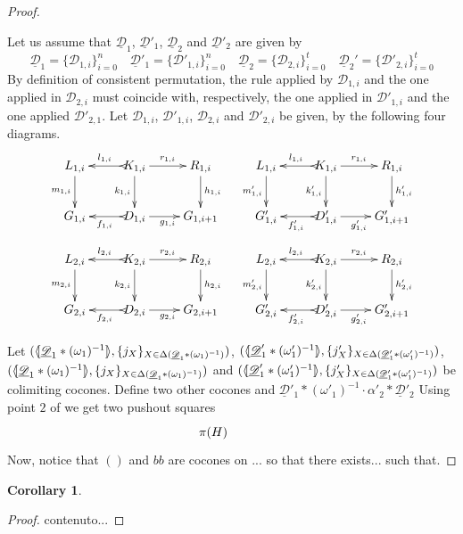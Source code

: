 \documentclass[a4paper]{article}
\newcommand{\dder}[1]{\mathscr{#1}}
\newcommand{\der}[1]{\underline{\dder{#1}}}
\newcommand{\lpro}{\langle \hspace{-1.85pt}[}
\newcommand{\rpro}{]\hspace{-1.85pt}\rangle}
\newtheorem{corollary}[theorem]{Corollary}
\theoremstyle{definition}
\begin{document}
\begin{proof}
\begin{itemize}
		
		Let us assume that $\der{D}_1$, $\der{D}'_1$, $\der{D}_2$ and $\der{D}'_2$ are given by
		\[\der{D}_1=\{\dder{D}_{1,i}\}_{i=0}^n \quad \der{D}'_1=\{\dder{D}'_{1,i}\}_{i=0}^n \quad \der{D}_2=\{\dder{D}_{2,i}\}_{i=0}^t \quad \der{D}_2'=\{\dder{D}'_{2,i}\}_{i=0}^t\]
		By definition of consistent permutation, the rule applied by $\dder{D}_{1,i}$ and the one applied in $\dder{D}_{2,i}$  must coincide with, respectively, the one applied in $\dder{D}'_{1,i}$ and the one applied $\dder{D}'_{2,1}$. Let $\dder{D}_{1,i}$, $\dder{D}'_{1,i}$, $\dder{D}_{2,i}$ and $\dder{D}'_{2,i}$ be given, by the following four diagrams. 
		\[\xymatrix{L_{1,i} \ar[d]_{m_{1, i}}& K_{1,i} \ar[d]_{k_{1, i}} \ar[r]^{r_{1,i}} \ar@{>->}[l]_{l_{1,i}} & R_{1,i}\ar[d]^{h_{1, i}} &L_{1,i} \ar[d]_{m'_{1, i}}& K_{1,i} \ar[d]_{k'_{1, i}} \ar[r]^{r_{1,i}} \ar@{>->}[l]_{l_{1,i}} & R_{1,i}\ar[d]^{h'_{1, i}} \\G_{1,i} & D_{1,i} \ar[r]_{g_{1,i}} \ar@{>->}[l]^{f_{1,i}} & G_{1,i+1} & G'_{1,i} & D'_{1,i}\ar[r]_{g'_{1,i}} \ar@{>->}[l]^{f'_{1,i}}  & G'_{1,i+1}}\]		
		\[\xymatrix{L_{2,i} \ar[d]_{m_{2, i}}& K_{2,i} \ar[d]_{k_{2, i}} \ar[r]^{r_{2,i}} \ar@{>->}[l]_{l_{2,i}} & R_{2,i}\ar[d]^{h_{2, i}} &L_{2,i} \ar[d]_{m'_{2, i}}& K_{2,i} \ar[d]_{k'_{2, i}} \ar[r]^{r_{2,i}} \ar@{>->}[l]_{l_{2,i}} & R_{2,i}\ar[d]^{h'_{2, i}} \\G_{2,i} & D_{2,i} \ar[r]_{g_{2,i}} \ar@{>->}[l]^{f_{2,i}} & G_{2,i+1} & G'_{2,i} & D'_{2,i}\ar[r]_{g'_{2,i}} \ar@{>->}[l]^{f'_{2,i}}  & G'_{2,i+1}}\] 
	\end{itemize}
	Let $(\lpro \der{D}_1*(\omega_1)^{-1}\rpro, \{j_X\}_{X\in \Delta( \der{D}_1*(\omega_1)^{-1})})$, $(\lpro \der{D}'_1*(\omega'_1)^{-1}\rpro, \{j'_X\}_{X\in \Delta( \der{D}'_1*(\omega'_1)^{-1})})$, $(\lpro \der{D}_1*(\omega_1)^{-1}\rpro, \{j_X\}_{X\in \Delta( \der{D}_1*(\omega_1)^{-1})})$ and $(\lpro \der{D}'_1*(\omega'_1)^{-1}\rpro, \{j'_X\}_{X\in \Delta( \der{D}'_1*(\omega'_1)^{-1})})$ be colimiting cocones. Define two other cocones and  $\der{D}'_1*(\omega'_1)^{-1}\cdot \alpha'_2*\der{D}'_2$
	Using point $2$ of  we get two pushout squares
	\[\xymatrix{\pi(H) & }\]
	Now, notice that $()$ and $bb$ are cocones on ... so that there exists... such that. 
\end{proof}

\begin{corollary}\label{cor:presuffix}
\end{corollary}
\begin{proof}
	contenuto...
\end{proof}
\end{document}
